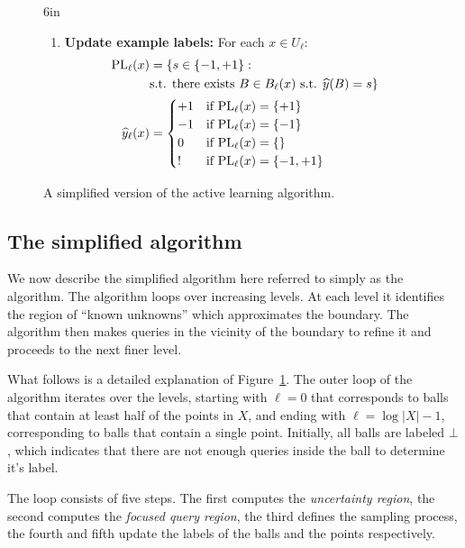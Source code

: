 \documentclass[twoside]{article}
\def\yh{{\widehat{y}}}
\def\PL{{\mbox{\rm PL}}}
\begin{document}
\begin{figure}[t]{6in}
{\begin{minipage}[t]{6in}
\begin{center}
\begin{enumerate}[leftmargin=0.6cm]
\item \label{step:examples} {\bf Update example labels:} For each $x \in U_\ell$:
  \begin{align}
    \PL_\ell(x) &= \{s \in \{-1, +1\}: \\
               & \text{s.t. there exists } B \in B_\ell(x) \text{ s.t. } \yh(B) = s \} \\ 
    \yh_\ell(x) &= 
                  \begin{cases}
                    +1 & \text{if } \PL_\ell(x) = \{+1\} \\
                    -1 & \text{if } \PL_\ell(x) = \{-1\} \\
                    0  & \text{if } \PL_\ell(x) = \{\} \\
                    !  & \text{if } \PL_\ell(x) = \{-1,+1\}
                  \end{cases}
                  \label{eq:provisional-label}
  \end{align}
\end{enumerate}
\end{center}

\end{minipage}}
\caption{A simplified version of the active learning algorithm.}
\label{alg:simple}
\end{figure}

\subsection{The simplified algorithm}

We now describe the simplified algorithm here referred to simply as
the algorithm. The algorithm loops over increasing levels.  At each
level it identifies the region of ``known unknowns'' which approximates
the boundary. The algorithm then makes queries in the vicinity of the
boundary to refine it and proceeds to the next finer level.

What follows is a detailed explanation of  Figure~\ref{alg:simple}.
The outer loop of the algorithm iterates over the
levels, starting with $\ell=0$ that corresponds to balls that contain
at least half of the points in $X$, and ending with $\ell=\log |X|-1$,
corresponding to balls that contain a single point. Initially, all balls are labeled $\bot$, which indicates that there are not enough queries inside the ball to determine it's label.

The loop consists of five steps. The first computes the {\em uncertainty
region}, the second computes the {\em focused query region}, the third defines the
sampling process, the fourth and fifth update the labels of the balls
and the points respectively.
\end{document}
